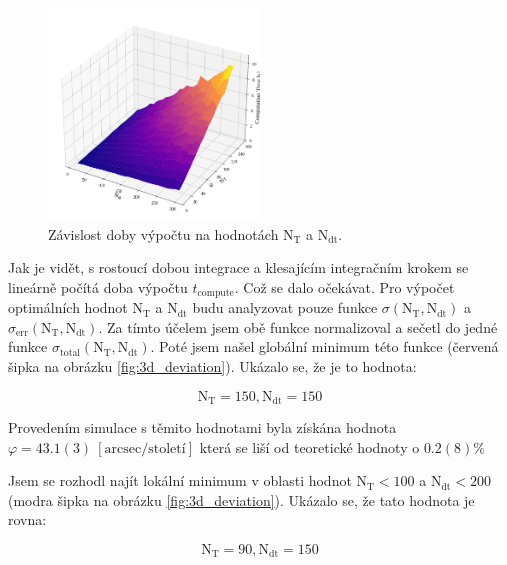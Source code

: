 \documentclass[a4paper,11pt,twocolumn]{article}
\begin{document}
            \begin{figure}
                \centering
                \includegraphics[width=0.5\textwidth]{3d_time.png}
                \caption{Závislost doby výpočtu na hodnotách $\text{N}_{\text{T}}$ a $\text{N}_{\text{dt}}$.}
                \label{fig:3d_time}
            \end{figure}

            Jak je vidět, s rostoucí dobou integrace a klesajícím integračním krokem se lineárně počítá doba výpočtu $t_{\text{compute}}$. Což se dalo očekávat. Pro výpočet optimálních hodnot $\text{N}_{\text{T}}$ a $\text{N}_{\text{dt}}$ budu analyzovat pouze funkce $\sigma(\text{N}_{\text{T}}, \text{N}_{\text{dt}})$ a $\sigma_{\text{err}}(\text{N}_{\text{T}}, \text{N}_{\text{dt}})$. Za tímto účelem jsem obě funkce normalizoval a sečetl do jedné funkce $\sigma_{\text{total}}(\text{N}_{\text{T}}, \text{N}_{\text{dt}})$. Poté jsem našel globální minimum této funkce (červená šipka na obrázku \ref{fig:3d_deviation}). Ukázalo se, že je to hodnota:
            
            \begin{equation*}
                \text{N}_{\text{T}} = 150, \text{N}_{\text{dt}} = 150
            \end{equation*}

            Provedením simulace s těmito hodnotami byla získána hodnota $\varphi = 43.1(3) ~[\text{arcsec/století}]$ která se liší od teoretické hodnoty o $0.2(8)\%$

            Jsem se rozhodl najít lokální minimum v oblasti hodnot $\text{N}_{\text{T}} < 100$ a $\text{N}_{\text{dt}} < 200$ (modra šipka na obrázku \ref{fig:3d_deviation}). Ukázalo se, že tato hodnota je rovna:

            \begin{equation*}
                \text{N}_{\text{T}} = 90, \text{N}_{\text{dt}} = 150
            \end{equation*}
\end{document}
